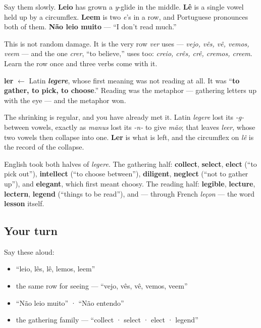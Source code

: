 Say them slowly. \textbf{Leio} has grown a \emph{y}-glide in the middle. \textbf{Lê} is a single vowel held up by a circumflex. \textbf{Leem} is two \emph{e}'s in a row, and Portuguese pronounces both of them. \textbf{Não leio muito} — \textquotedblleft{}I don't read much.\textquotedblright{}

This is not random damage. It is the very row \emph{ver} uses — \emph{vejo, vês, vê, vemos, veem} — and the one \emph{crer}, \textquotedblleft{}to believe,\textquotedblright{} uses too: \emph{creio, crês, crê, cremos, creem}. Learn the row once and three verbs come with it.

\begin{cousinweb}
\textbf{ler} $\leftarrow$ Latin \emph{\textbf{legere}}, whose first meaning was not reading at all. It was \textquotedblleft{}\textbf{to gather, to pick, to choose}.\textquotedblright{} Reading was the metaphor — gathering letters up with the eye — and the metaphor won.

The shrinking is regular, and you have already met it. Latin \emph{legere} lost its \emph{-g-} between vowels, exactly as \emph{manus} lost its \emph{-n-} to give \emph{mão}; that leaves \emph{leer}, whose two vowels then collapse into one. \textbf{Ler} is what is left, and the circumflex on \emph{lê} is the record of the collapse.

English took both halves of \emph{legere}. The gathering half: \textbf{collect}, \textbf{select}, \textbf{elect} (\textquotedblleft{}to pick out\textquotedblright{}), \textbf{intellect} (\textquotedblleft{}to choose between\textquotedblright{}), \textbf{diligent}, \textbf{neglect} (\textquotedblleft{}not to gather up\textquotedblright{}), and \textbf{elegant}, which first meant choosy. The reading half: \textbf{legible}, \textbf{lecture}, \textbf{lectern}, \textbf{legend} (\textquotedblleft{}things to be read\textquotedblright{}), and — through French \emph{leçon} — the word \textbf{lesson} itself.
\end{cousinweb}

\subsection*{Your turn}
Say these aloud:

\begin{itemize}
\raggedright
  \item \textquotedblleft{}leio, lês, lê, lemos, leem\textquotedblright{}
  \item the same row for seeing — \textquotedblleft{}vejo, vês, vê, vemos, veem\textquotedblright{}
  \item \textquotedblleft{}Não leio muito\textquotedblright{} · \textquotedblleft{}Não entendo\textquotedblright{}
  \item the gathering family — \textquotedblleft{}collect · select · elect · legend\textquotedblright{}
\end{itemize}

